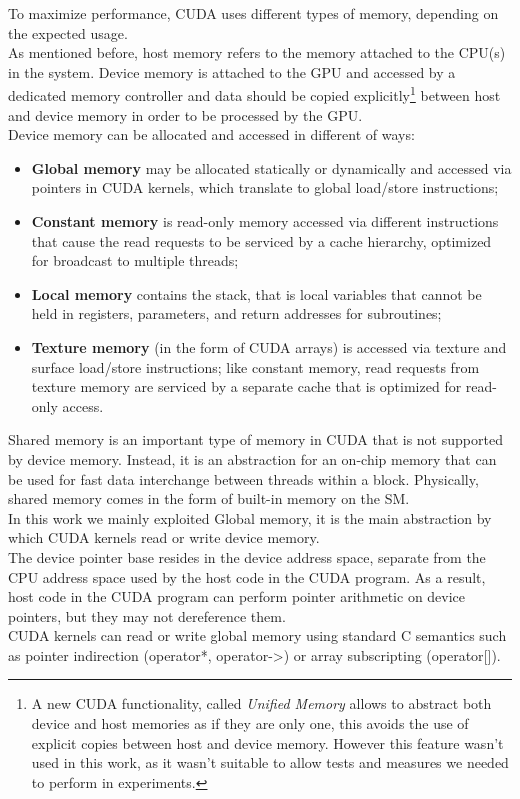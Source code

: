 	
To maximize performance, CUDA uses different types of memory, depending on the expected usage.\\
As mentioned before, host memory refers to the memory attached to the CPU(s) in the system. Device memory is attached to the GPU and accessed by a dedicated memory controller and data should be copied explicitly\footnote{A new CUDA functionality, called \textit{Unified Memory} allows to abstract both device and host memories as if they are only one, this avoids the use of explicit copies between host and device memory. However this feature wasn't used in this work, as it wasn't suitable to allow tests and measures we needed to perform in experiments. } between host and device memory in order to be processed by the GPU.\\
Device memory can be allocated and accessed in different of ways:
\begin{itemize}
	\item \textbf{Global memory} may be allocated statically or dynamically and accessed via pointers in CUDA kernels, which translate to global load/store instructions;
	\item \textbf{Constant memory} is read-only memory accessed via different instructions that cause the read requests to be serviced by a cache hierarchy, optimized for broadcast to multiple threads;
	\item \textbf{Local memory} contains the stack, that is local variables that cannot be held in registers, parameters, and return addresses for subroutines;
	\item \textbf{Texture memory} (in the form of CUDA arrays) is accessed via texture and surface load/store instructions; like constant memory, read requests from texture memory are serviced by a separate cache that is optimized for read-only access.
\end{itemize}
Shared memory is an important type of memory in CUDA that is not supported by device memory. Instead, it is an abstraction for an on-chip memory that can be used for fast data interchange between threads within a block. Physically, shared memory comes in the form of built-in memory on the SM.\\
In this work we mainly exploited Global memory, it is the main abstraction by which CUDA kernels read or write device memory.\\
The device pointer base resides in the device address space, separate from the CPU address space used by the host code in the CUDA program. As a result, host code in the CUDA program can perform pointer arithmetic on device pointers, but they may not dereference them.\\
CUDA kernels can read or write global memory using standard C semantics such as pointer indirection (operator*, operator->) or array subscripting (operator[])\cite{cudahandbook}. 

